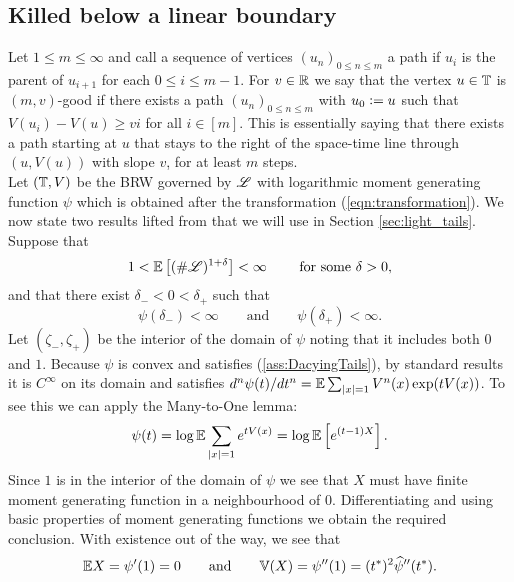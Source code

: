 \subsection{Killed below a linear boundary}

Let $1 \leq m \leq \infty$ and call a sequence of vertices $(u_n)_{0 \leq n \leq m}$ a path if $u_i$ is the parent of $u_{i+1}$ for each $0 \leq i \leq m-1$. For $v \in \mathbb{R}$ we say that the vertex $u \in \mathbb{T}$ is $(m, v)$-good if there exists a path $(u_n)_{0 \leq n \leq m}$ with $u_0 \vcentcolon= u$ such that $V(u_i) - V(u) \geq vi$ for all $i \in [m]$. This is essentially saying that there exists a path starting at $u$ that stays to the right of the space-time line through $(u, V(u))$ with slope $v$, for at least $m$ steps. \\

Let $(\mathbb{T}, V)$ be the BRW governed by $\mathscr{L}$ with logarithmic moment generating function $\psi$ which is obtained after the transformation (\ref{eqn:transformation}). We now state two results lifted from \cite{gantert2008asymptotics} that we will use in Section \ref{sec:light_tails}. Suppose that 
\begin{equation}\label{ass:killed_assumption_Lp}
1 < \mathbb{E}\left[ (\# \mathscr{L})^{1 + \delta} \right] < \infty\qquad\text{ for some } \delta > 0, 
\end{equation}
and that there exist $\delta_- < 0 < \delta_+$ such that
\begin{equation}\label{ass:DacyingTails}
\psi(\delta_-) < \infty \qquad\text{and}\qquad \psi(\delta_+) < \infty. 
\end{equation}
Let $(\zeta_-, \zeta_+)$ be the interior of the domain of $\psi$ noting that it includes both $0$ and $1$. Because $\psi$ is convex and satisfies (\ref{ass:DacyingTails}), by standard results it is $C^\infty$ on its domain and satisfies $d^n \psi(t) / dt^n = \mathbb{E} \sum_{|x|=1} V^n(x) \exp(t V(x))$. To see this we can apply the Many-to-One lemma:
\begin{equation}\nonumber
\psi(t) = \log \mathbb{E} \sum\limits_{|x| = 1} e^{t V(x)} = \log \mathbb{E}\left[ e^{(t - 1)X} \right]. 
\end{equation}
Since $1$ is in the interior of the domain of $\psi$ we see that $X$ must have finite moment generating function in a neighbourhood of $0$. Differentiating and using basic properties of moment generating functions we obtain the required conclusion. With existence out of the way, we see that 
\begin{equation}\nonumber
\mathbb{E}{X} = \psi'(1) = 0 \qquad\text{and}\qquad \mathbb{V}(X) = \psi''(1) = (t^*)^2 \widehat{\psi}''(t^*). 
\end{equation} \\

